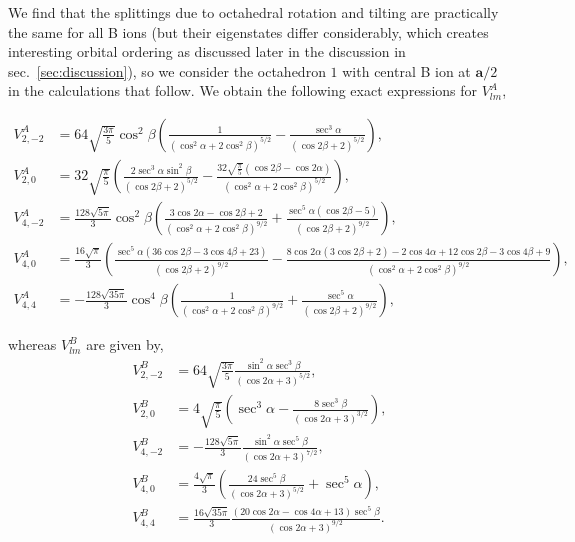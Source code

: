 \documentclass[a4paper,prb,twocolumn]{revtex4-1}  %
\newcommand{\rev}[1]{{\color{blue}{#1}}}
\newcommand{\az}[1]{{\color{magenta}{#1}}} %
\begin{document}
We find that the splittings due to octahedral rotation and tilting are practically the same for all B ions
(but their eigenstates differ considerably, which creates interesting orbital ordering as discussed later in the discussion in sec.~\ref{sec:discussion}),
so we consider the octahedron $1$ with central B ion at $\textbf{a}/2$
in the calculations that follow.
We obtain the following exact expressions for $V_{lm}^{A}$,
\begin{widetext}
\begin{align}
V^A_{2,-2}&= 64 \sqrt{\frac{3 \pi }{5}} \cos ^2\beta  \left(\frac{1}{\left(\cos ^2\alpha +2 \cos ^2\beta \right)^{5/2}}-\frac{\sec ^3\alpha }{(\cos 2 \beta +2)^{5/2}}\right),\\
V^A_{2,0}&= 32 \sqrt{\frac{\pi }{5}} \left(\frac{2 \sec ^3\alpha  \sin ^2\beta }{(\cos 2 \beta +2)^{5/2}}-\frac{32 \sqrt{\frac{\pi }{5}} (\cos 2 \beta -\cos 2 \alpha )}{\left(\cos ^2\alpha +2 \cos ^2\beta \right)^{5/2}}\right),\\
V^A_{4,-2}&= \frac{128\sqrt{5 \pi } }{3} \cos ^2\beta  \left(\frac{3 \cos 2 \alpha -\cos 2 \beta +2}{\left(\cos ^2\alpha +2 \cos ^2\beta \right)^{9/2}}+\frac{\sec ^5\alpha  (\cos 2 \beta -5)}{(\cos 2 \beta +2)^{9/2}}\right),\\ \nonumber
V^A_{4,0}&= \frac{16\sqrt{\pi } }{3} \left(
\frac{\sec ^5\alpha  (36 \cos 2 \beta -3 \cos 4 \beta +23)}{(\cos 2 \beta +2)^{9/2}}
-
\frac{8 \cos 2 \alpha  (3 \cos 2 \beta +2)-2 \cos 4 \alpha+12 \cos 2 \beta -3 \cos 4 \beta +9}{\left(\cos ^2\alpha +2 \cos ^2\beta \right)^{9/2}}
\right),\\
V^A_{4,4}&=-\frac{128\sqrt{35 \pi } }{3} \cos ^4\beta  \left(\frac{1}{\left(\cos ^2\alpha +2 \cos ^2\beta \right)^{9/2}}+\frac{\sec ^5\alpha }{(\cos 2 \beta +2)^{9/2}}\right),
\end{align}
\end{widetext}
whereas $V_{lm}^{B}$ are given by,
\begin{align}
V^{B}_{2,-2}&= 64 \sqrt{\frac{3 \pi }{5}}  \frac{\sin ^2\alpha  \sec ^3\beta }{(\cos 2 \alpha +3)^{5/2}},
 \\ V^{B}_{2,0}&=  4 \sqrt{\frac{\pi }{5}} \left(\sec ^3\alpha -\frac{8 \sec ^3\beta }{(\cos 2 \alpha +3)^{3/2}}\right),\\
 V^{B}_{4,-2}&=  - \frac{128 \sqrt{5 \pi } }{3} \frac{\sin ^2\alpha  \sec ^5\beta }{ (\cos 2 \alpha +3)^{7/2}},\\ 
V^{B}_{4,0}&= \frac{4\sqrt{\pi } }{3} \left(\frac{24 \sec ^5\beta }{(\cos 2 \alpha +3)^{5/2}}+\sec ^5\alpha \right),\\
 V^{B}_{4,4}&=  \frac{16 \sqrt{35 \pi } }{3} \frac{(20 \cos 2 \alpha -\cos 4 \alpha +13) 
 \sec ^5\beta }
 {(\cos 2 \alpha +3)^{9/2}}.
 \end{align}
\end{document}
